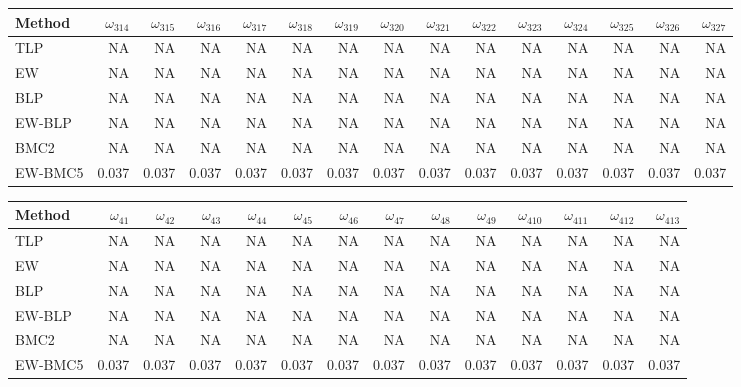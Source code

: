 \documentclass[
]{article}
\begin{document}
\begin{tabular}{lrrrrrrrrrrrrrr}
\toprule
Method & $\omega_{314}$ & $\omega_{315}$ & $\omega_{316}$ & $\omega_{317}$ & $\omega_{318}$ & $\omega_{319}$ & $\omega_{320}$ & $\omega_{321}$ & $\omega_{322}$ & $\omega_{323}$ & $\omega_{324}$ & $\omega_{325}$ & $\omega_{326}$ & $\omega_{327}$\\
\midrule
TLP & NA & NA & NA & NA & NA & NA & NA & NA & NA & NA & NA & NA & NA & NA\\
EW & NA & NA & NA & NA & NA & NA & NA & NA & NA & NA & NA & NA & NA & NA\\
BLP & NA & NA & NA & NA & NA & NA & NA & NA & NA & NA & NA & NA & NA & NA\\
EW-BLP & NA & NA & NA & NA & NA & NA & NA & NA & NA & NA & NA & NA & NA & NA\\
BMC2 & NA & NA & NA & NA & NA & NA & NA & NA & NA & NA & NA & NA & NA & NA\\
EW-BMC5 & 0.037 & 0.037 & 0.037 & 0.037 & 0.037 & 0.037 & 0.037 & 0.037 & 0.037 & 0.037 & 0.037 & 0.037 & 0.037 & 0.037\\
\bottomrule
\end{tabular}

\begin{tabular}{lrrrrrrrrrrrrr}
\toprule
Method & $\omega_{41}$ & $\omega_{42}$ & $\omega_{43}$ & $\omega_{44}$ & $\omega_{45}$ & $\omega_{46}$ & $\omega_{47}$ & $\omega_{48}$ & $\omega_{49}$ & $\omega_{410}$ & $\omega_{411}$ & $\omega_{412}$ & $\omega_{413}$\\
\midrule
TLP & NA & NA & NA & NA & NA & NA & NA & NA & NA & NA & NA & NA & NA\\
EW & NA & NA & NA & NA & NA & NA & NA & NA & NA & NA & NA & NA & NA\\
BLP & NA & NA & NA & NA & NA & NA & NA & NA & NA & NA & NA & NA & NA\\
EW-BLP & NA & NA & NA & NA & NA & NA & NA & NA & NA & NA & NA & NA & NA\\
BMC2 & NA & NA & NA & NA & NA & NA & NA & NA & NA & NA & NA & NA & NA\\
EW-BMC5 & 0.037 & 0.037 & 0.037 & 0.037 & 0.037 & 0.037 & 0.037 & 0.037 & 0.037 & 0.037 & 0.037 & 0.037 & 0.037\\
\bottomrule
\end{tabular}
\end{document}
